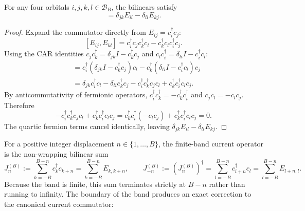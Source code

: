 \begin{proposition}
\label{prop:ch19-bilinear-commutator}
For any four orbitals $i, j, k, l \in \mathcal B_B$, the bilinears satisfy
\begin{equation}
 [E_{ij}, E_{kl}] = \delta_{jk} E_{il} - \delta_{li} E_{kj}.
 \label{eq:ch19-bilinear-comm}
\end{equation}
\end{proposition}
\begin{proof}
Expand the commutator directly from $E_{ij} = c_i^\dagger c_j$:
\[
 [E_{ij}, E_{kl}] = c_i^\dagger c_j c_k^\dagger c_l - c_k^\dagger c_l c_i^\dagger c_j.
\]
Using the CAR identities $c_j c_k^\dagger = \delta_{jk}I - c_k^\dagger c_j$ and
$c_l c_i^\dagger = \delta_{li}I - c_i^\dagger c_l$:
\begin{align*}
 [E_{ij}, E_{kl}]
   &= c_i^\dagger (\delta_{jk}I - c_k^\dagger c_j) c_l - c_k^\dagger (\delta_{li}I - c_i^\dagger c_l) c_j \\
   &= \delta_{jk} c_i^\dagger c_l - \delta_{li} c_k^\dagger c_j
      - c_i^\dagger c_k^\dagger c_j c_l + c_k^\dagger c_i^\dagger c_l c_j.
\end{align*}
By anticommutativity of fermionic operators, $c_i^\dagger c_k^\dagger = -c_k^\dagger c_i^\dagger$
and $c_j c_l = -c_l c_j$.  Therefore
\[
 - c_i^\dagger c_k^\dagger c_j c_l + c_k^\dagger c_i^\dagger c_l c_j
  = c_k^\dagger c_i^\dagger (-c_l c_j) + c_k^\dagger c_i^\dagger c_l c_j = 0.
\]
The quartic fermion terms cancel identically, leaving $\delta_{jk} E_{il} - \delta_{li} E_{kj}$.
\end{proof}

For a positive integer displacement $n \in \{1, \ldots, B\}$, the finite-band current
operator is the non-wrapping bilinear sum
\begin{equation}
 J_n^{(B)} := \sum_{k=-B}^{B-n} c_k^\dagger c_{k+n} = \sum_{k=-B}^{B-n} E_{k, k+n},
 \qquad
 J_{-n}^{(B)} := (J_n^{(B)})^\dagger = \sum_{l=-B}^{B-n} c_{l+n}^\dagger c_l = \sum_{l=-B}^{B-n} E_{l+n, l}.
 \label{eq:ch19-finite-current-def}
\end{equation}
Because the band is finite, this sum terminates strictly at $B-n$ rather than running
to infinity.  The boundary of the band produces an exact correction to the canonical
current commutator:

